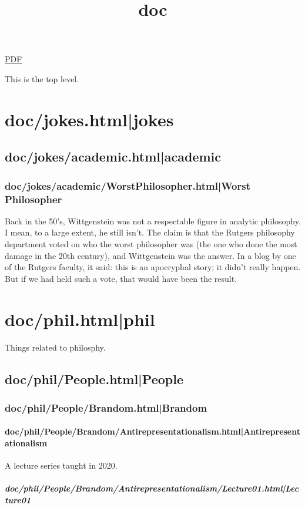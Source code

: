 \documentclass[12pt,a4paper]{report}
\begin{document}
 \href{doc.pdf}{PDF} 
\title{doc}

\tableofcontents
This is the top level.
\part{doc/jokes.html|jokes}

\chapter{doc/jokes/academic.html|academic}

\section{doc/jokes/academic/WorstPhilosopher.html|Worst Philosopher}
Back in the 50's, Wittgenstein was not a respectable figure in analytic
philosophy. I mean, to a large extent, he still isn't. The claim is that the
Rutgers philosophy department voted on who the worst philosopher was (the one
who done the most damage in the 20th century), and Wittgenstein was the answer.
In a blog by one of the Rutgers faculty, it said: this is an apocryphal story;
it didn't really happen. But if we had held such a vote, that would have been
the result.

\part{doc/phil.html|phil}
Things related to philosphy.
\chapter{doc/phil/People.html|People}

\section{doc/phil/People/Brandom.html|Brandom}

\subsection{doc/phil/People/Brandom/Antirepresentationalism.html|Antirepresentationalism}
A lecture series taught in 2020.
\subsubsection{doc/phil/People/Brandom/Antirepresentationalism/Lecture01.html|Lecture01}
\end{document}
